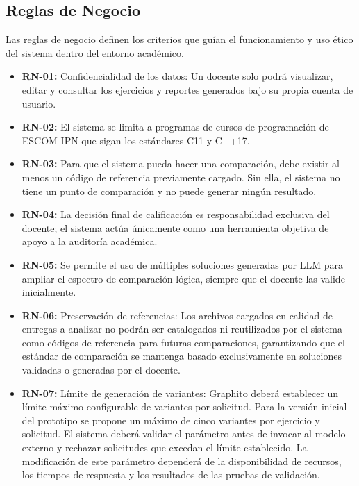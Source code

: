 \subsection{Reglas de Negocio}

Las reglas de negocio definen los criterios que guían el funcionamiento y uso ético del sistema dentro del entorno académico.

\begin{itemize}
	\item \textbf{RN-01:} Confidencialidad de los datos: Un docente solo podrá visualizar, editar y consultar los ejercicios y reportes generados bajo su propia cuenta de usuario.

	\item \textbf{RN-02:} El sistema se limita a programas de cursos de programación de ESCOM-IPN que sigan los estándares C11 y C++17.

	\item \textbf{RN-03:} Para que el sistema pueda hacer una comparación, debe existir al menos un código de referencia previamente cargado. Sin ella, el sistema no tiene un punto de comparación y no puede generar ningún resultado.
    
	\item \textbf{RN-04:} La decisión final de calificación es responsabilidad exclusiva del docente; el sistema actúa únicamente como una herramienta objetiva de apoyo a la auditoría académica.

	\item \textbf{RN-05:} Se permite el uso de múltiples soluciones generadas por LLM para ampliar el espectro de comparación lógica, siempre que el docente las valide inicialmente.

	\item \textbf{RN-06:} Preservación de referencias: Los archivos cargados en calidad de entregas a analizar no podrán ser catalogados ni reutilizados por el sistema como códigos de referencia para futuras comparaciones, garantizando que el estándar de comparación se mantenga basado exclusivamente en soluciones validadas o generadas por el docente.

	\item \textbf{RN-07:} Límite de generación de variantes: Graphito deberá establecer un límite máximo configurable de variantes por solicitud. Para la versión inicial del prototipo se propone un máximo de cinco variantes por ejercicio y solicitud. El sistema deberá validar el parámetro antes de invocar al modelo externo y rechazar solicitudes que excedan el límite establecido. La modificación de este parámetro dependerá de la disponibilidad de recursos, los tiempos de respuesta y los resultados de las pruebas de validación.
\end{itemize}

